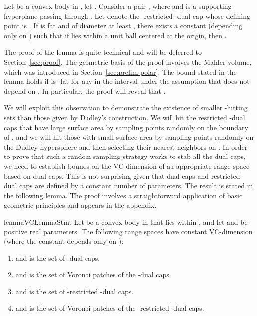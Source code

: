\documentclass[11pt]{article}   \usepackage[letterpaper,hmargin=2.1cm,vmargin=3cm]{geometry}
\begin{document}
\begin{lemma} \label{lem:dual-basic}
Let  be a convex body in , let . Consider a pair , where  and  is a supporting hyperplane passing through . Let  denote the -restricted -dual cap whose defining point is . If  is fat and of diameter at least , there exists a constant  (depending only on ) such that if  lies within a unit ball centered at the origin, then .
\end{lemma}


The proof of the lemma is quite technical and will be deferred to Section~\ref{sec:proof}. The geometric basis of the proof involves the Mahler volume, which was introduced in Section~\ref{sec:prelim-polar}. The bound stated in the lemma holds if  is -fat for any  in the interval  under the assumption that  does not depend on . In particular, the proof will reveal that .

We will exploit this observation to demonstrate the existence of smaller -hitting sets than those given by Dudley's construction. We will hit the restricted -dual caps that have large surface area by sampling points randomly on the boundary of , and we will hit those with small surface area by sampling points randomly on the Dudley hypersphere and then selecting their nearest neighbors on . In order to prove that such a random sampling strategy works to stab all the dual caps, we need to establish bounds on the VC-dimension of an appropriate range space based on dual caps. This is not surprising given that dual caps and restricted dual caps are defined by a constant number of parameters. The result is stated in the following lemma. The proof involves a straightforward application of basic geometric principles and appears in the appendix.

\begin{restatable}{lemma}{VCLemmaStmt}\label{lem:VC}
Let  be a convex body in  that lies within , and let  and  be positive real parameters. The following range spaces  have constant VC-dimension (where the constant depends only on ):
\begin{enumerate}
	\setlength{\itemsep}{-0.5ex}\setlength{\parsep}{0pt}\item[]  and  is the set of -dual caps.
	\item[]  and  is the set of Voronoi patches of the -dual caps.
	\item[]  and  is the set of -restricted -dual caps.
	\item[]  and  is the set of Voronoi patches of the -restricted -dual caps.
\end{enumerate}
\end{restatable}
\end{document}
